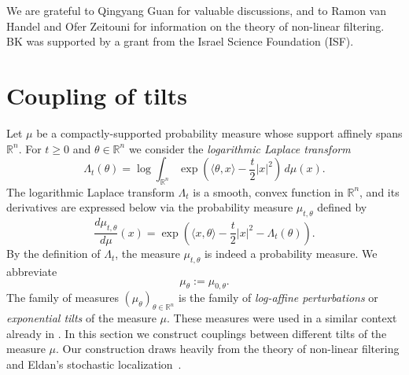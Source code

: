 \documentclass[12pt,a4paper]{article}
\newcommand{\RR}{\mathbb{R}}
\theoremstyle{definition}
\begin{document}
 We are grateful to Qingyang Guan for valuable discussions, and to Ramon van Handel and Ofer Zeitouni
for information on the theory of non-linear filtering. BK was supported by a grant from the Israel Science Foundation (ISF).


\section{Coupling of tilts}
\label{sec2}


Let $\mu$ be a compactly-supported probability measure whose support
affinely spans $\RR^n$. For $t \geq 0$ and $\theta \in \RR^n$ we consider
the {\it logarithmic Laplace transform}
$$ \Lambda_t(\theta) = \log \int_{\RR^n} \exp \left( \langle \theta , x \rangle - \frac t2 |x|^2 \right) \, d \mu (x) . $$
The logarithmic Laplace transform $\Lambda_t$ is a smooth, convex function in $\RR^n$, and its derivatives are expressed below via the probability measure
$\mu_{t,\theta}$ defined by
\begin{equation}
\label{eq_1045}
\frac{d \mu_{t,\theta}}{d\mu} (x) = \exp \left( \langle x,\theta\rangle -\frac t2 \vert x\vert^2 - \Lambda_t ( \theta ) \right).
\end{equation}
By the definition of $\Lambda_t$, the measure $\mu_{t,\theta}$
is indeed a probability measure. We abbreviate $$ \mu_{\theta} := \mu_{0,\theta}. $$ The family of measures $(\mu_\theta)_{\theta \in \RR^n}$ 
is the family of  \emph{log-affine perturbations} or 
\emph{exponential tilts} of the measure $\mu$. These measures were used in a similar context already in \cite{K_quarter}.
In this section we construct couplings between different tilts
of the measure $\mu$.
Our construction draws heavily from the theory of non-linear filtering \cite{chigansky} and Eldan's stochastic localization~\cite{eldan1}.
\end{document}
